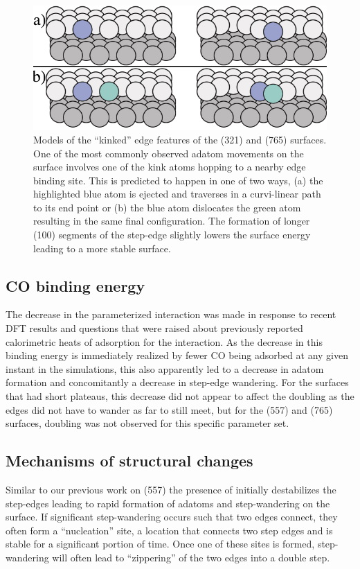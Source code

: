 \begin{figure}
  \includegraphics[width=\linewidth]{../figures/chap4/kinkMovement.pdf}
  \caption{Models of the ``kinked'' edge features of the (321) and (765)
surfaces.  One of the most commonly observed adatom movements on the surface
involves one of the kink atoms hopping to a nearby edge binding site. This is
predicted to happen in one of two ways, (a) the highlighted blue atom is
ejected and traverses in a curvi-linear path to its end point or (b) the blue
atom dislocates the green atom resulting in the same final configuration. The
formation of longer (100) segments of the step-edge slightly lowers the surface
energy leading to a more stable surface.}
  \label{fig:kinkSketch}
\end{figure}

\subsection{CO binding energy}
The decrease in the parameterized  interaction was made in
response to recent DFT results\citep{Deshlahra:2012aa} and questions that were
raised about previously reported calorimetric heats of adsorption for the
 interaction.\citep{Yeo:1997th} As the decrease in this binding
energy is immediately realized by fewer CO being adsorbed at any given instant
in the simulations, this also apparently led to a decrease in adatom formation
and concomitantly a decrease in step-edge wandering. For the surfaces that had
short plateaus, this decrease did not appear to affect the doubling as the
edges did not have to wander as far to still meet, but for the (557) and (765)
surfaces,  doubling was not observed for this specific parameter set.

\subsection{Mechanisms of structural changes}
Similar to our previous work on  (557) the presence of  initially
destabilizes the step-edges leading to rapid formation of adatoms and
step-wandering on the surface. If significant step-wandering occurs such that
two edges connect, they often form a ``nucleation'' site, a location that
connects two step edges and is stable for a significant portion of time. Once
one of these sites is formed, step-wandering will often lead to ``zippering''
of the two edges into a double step. 


